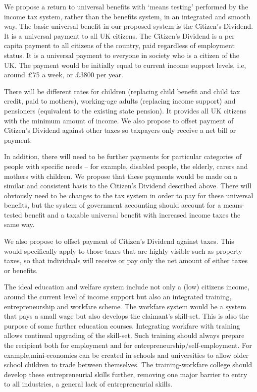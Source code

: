 \documentclass[]{tufte-handout}
\begin{document}
We propose a return to universal benefits with `means testing' performed
by the income tax system, rather than the benefits system, in an
integrated and smooth way. The basic universal benefit in our proposed
system is the Citizen's Dividend. It is a universal payment to all UK
citizens. The Citizen's Dividend is a per capita payment to all citizens
of the country, paid regardless of employment status. It is a universal
payment to everyone in society who is a citizen of the UK. The payment
would be initially equal to current income support levels, i.e, around
£75 a week, or £3800 per year.

There will be different rates for children (replacing child benefit and
child tax credit, paid to mothers), working-age adults (replacing income
support) and pensioners (equivalent to the existing state pension). It
provides all UK citizens with the minimum amount of income. We also
propose to offset payment of Citizen's Dividend against other taxes so
taxpayers only receive a net bill or payment.

In addition, there will need to be further payments for particular
categories of people with specific needs -- for example, disabled
people, the elderly, carers and mothers with children. We propose that
these payments would be made on a similar and consistent basis to the
Citizen's Dividend described above. There will obviously need to be
changes to the tax system in order to pay for these universal benefits,
but the system of government accounting should account for a
means-tested benefit and a taxable universal benefit with increased
income taxes the same way.

We also propose to offset payment of Citizen's Dividend against taxes.
This would specifically apply to those taxes that are highly visible
such as property taxes, so that individuals will receive or pay only the
net amount of either taxes or benefits.

The ideal education and welfare system include not only a (low) citizens
income, around the current level of income support but also an
integrated training, entrepreneurship and workfare scheme. The workfare
system would be a system that pays a small wage but also develops the
claimant's skill-set. This is also the purpose of some further education
courses. Integrating workfare with training allows continual upgrading
of the skill-set. Such training should always prepare the recipient both
for employment and for entrepreneurship/self-employment. For
example,mini-economies can be created in schools and universities to
allow older school children to trade between themselves. The
training-workfare college should develop these entrepreneurial skills
further, removing one major barrier to entry to all industries, a
general lack of entrepreneurial skills.
\end{document}
